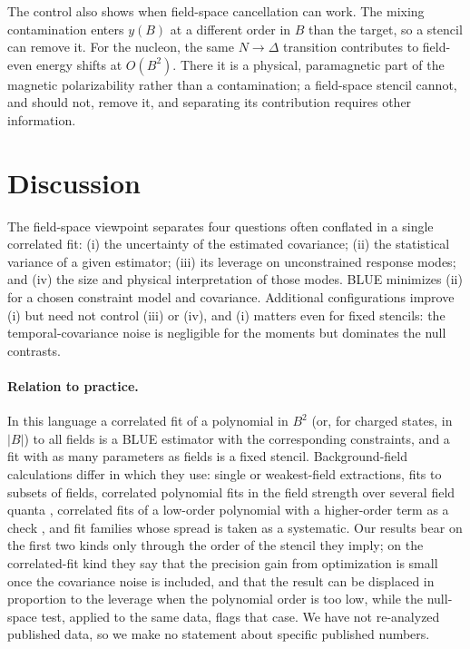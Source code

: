 \documentclass[aps,prd,reprint,twocolumn,superscriptaddress,nofootinbib,longbibliography]{revtex4-2}
\begin{document}
The control also shows when field-space cancellation can work. The mixing contamination enters $y(B)$ at a different order in $B$ than the target, so a stencil can remove it. For the nucleon, the same $N\to\Delta$ transition contributes to field-even energy shifts at $O(B^2)$. There it is a physical, paramagnetic part of the magnetic polarizability rather than a contamination; a field-space stencil cannot, and should not, remove it, and separating its contribution requires other information.

\section{Discussion}

The field-space viewpoint separates four questions often conflated in a single correlated fit: (i) the uncertainty of the estimated covariance; (ii) the statistical variance of a given estimator; (iii) its leverage on unconstrained response modes; and (iv) the size and physical interpretation of those modes. BLUE minimizes (ii) for a chosen constraint model and covariance. Additional configurations improve (i) but need not control (iii) or (iv), and (i) matters even for fixed stencils: the temporal-covariance noise is negligible for the moments but dominates the null contrasts.

\paragraph{Relation to practice.} In this language a correlated fit of a polynomial in $B^2$ (or, for charged states, in $|B|$) to all fields is a BLUE estimator with the corresponding constraints, and a fit with as many parameters as fields is a fixed stencil. Background-field calculations differ in which they use: single or weakest-field extractions, fits to subsets of fields, correlated polynomial fits in the field strength over several field quanta \cite{Chang2015LightNuclei}, correlated fits of a low-order polynomial with a higher-order term as a check \cite{Lee2005MagPol,Primer2014}, and fit families whose spread is taken as a systematic. Our results bear on the first two kinds only through the order of the stencil they imply; on the correlated-fit kind they say that the precision gain from optimization is small once the covariance noise is included, and that the result can be displaced in proportion to the leverage when the polynomial order is too low, while the null-space test, applied to the same data, flags that case. We have not re-analyzed published data, so we make no statement about specific published numbers.
\end{document}

